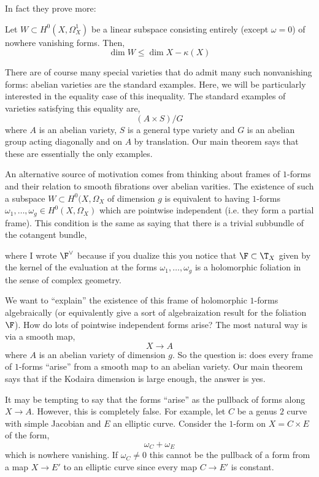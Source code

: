 \documentclass[12pt]{article}
\begin{document}
In fact they prove more:

\begin{theorem}
Let $W \subset H^0(X, \Omega^1_X)$ be a linear subspace consisting entirely (except $\omega = 0$) of nowhere vanishing forms. Then,
\[ \dim{W} \le \dim{X} - \kappa(X) \] 
\end{theorem}

There are of course many special varieties that do admit many such nonvanishing forms: abelian varieties are the standard examples. Here, we will be particularly interested in the equality case of this inequality. The standard examples of varieties satisfying this equality are,
\[ (A \times S) / G \]
where $A$ is an abelian variety, $S$ is a general type variety and $G$ is an abelian group acting diagonally and on $A$ by translation. Our main theorem says that these are essentially the only examples.


An alternative source of motivation comes from thinking about frames of $1$-forms and their relation to smooth fibrations over abelian varities. The existence of such a subspace $W \subset H^0(X, \Omega_X$ of dimension $g$ is equivalent to having $1$-forms $\omega_1, \dots, \omega_g \in H^0(X, \Omega_X)$ which are pointwise independent (i.e. they form a partial frame). This condition is the same as saying that there is a trivial subbundle of the cotangent bundle,
\begin{center}
\end{center}
where I wrote $\F^\vee$ because if you dualize this you notice that $\F \subset \T_X$ given by the kernel of the evaluation at the forms $\omega_1, \dots, \omega_g$ is a holomorphic foliation in the sense of complex geometry. 

We want to ``explain'' the existence of this frame of holomorphic $1$-forms algebraically (or equivalently give a sort of algebraization result for the foliation $\F$). How do lots of pointwise independent forms arise? The most natural way is via a smooth map,
\[ X \to A \]
where $A$ is an abelian variety of dimension $g$. So the question is: does every frame of $1$-forms ``arise'' from a smooth map to an abelian variety. Our main theorem says that if the Kodaira dimension is large enough, the answer is yes. 

\begin{example}
It may be tempting to say that the forms ``arise'' as the pullback of forms along $X \to A$. However, this is completely false. For example, let $C$ be a genus $2$ curve with simple Jacobian and $E$ an elliptic curve. Consider the $1$-form on $X = C \times E$ of the form,
\[ \omega_C + \omega_E \]
which is nowhere vanishing. If $\omega_C \neq 0$ this cannot be the pullback of a form from a map $X \to E'$ to an elliptic curve since every map $C \to E'$ is constant. 
\end{example}
\end{document}
